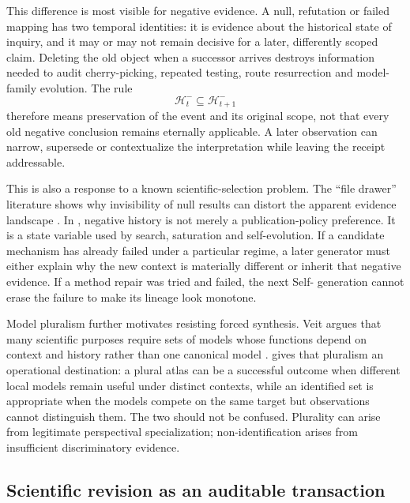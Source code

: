 This difference is most visible for negative evidence. A null, refutation or failed mapping has two temporal identities: it is evidence about the historical state of inquiry, and it may or may not remain decisive for a later, differently scoped claim. Deleting the old object when a successor arrives destroys information needed to audit cherry-picking, repeated testing, route resurrection and model-family evolution. The rule
\[
\mathcal H^-_t\subseteq \mathcal H^-_{t+1}
\]
therefore means preservation of the event and its original scope, not that every old negative conclusion remains eternally applicable. A later observation can narrow, supersede or contextualize the interpretation while leaving the receipt addressable.

This is also a response to a known scientific-selection problem. The ``file drawer'' literature shows why invisibility of null results can distort the apparent evidence landscape \cite{rosenthal1979,franco2014}. In \RAKL{}, negative history is not merely a publication-policy preference. It is a state variable used by search, saturation and self-evolution. If a candidate mechanism has already failed under a particular regime, a later generator must either explain why the new context is materially different or inherit that negative evidence. If a method repair was tried and failed, the next Self-\RAKL{} generation cannot erase the failure to make its lineage look monotone.

Model pluralism further motivates resisting forced synthesis. Veit argues that many scientific purposes require sets of models whose functions depend on context and history rather than one canonical model \cite{veit2020pluralism}. \RAKL{} gives that pluralism an operational destination: a plural atlas can be a successful outcome when different local models remain useful under distinct contexts, while an identified set is appropriate when the models compete on the same target but observations cannot distinguish them. The two should not be confused. Plurality can arise from legitimate perspectival specialization; non-identification arises from insufficient discriminatory evidence.

\subsection{Scientific revision as an auditable transaction}


